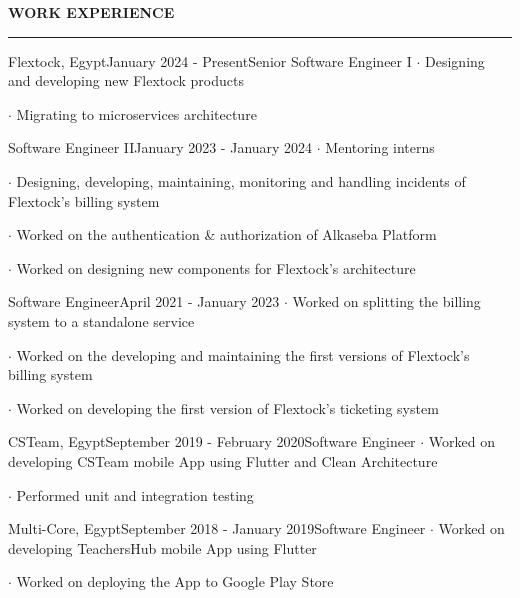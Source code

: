 \noindent\textcolor{themecolor}{\textbf{WORK EXPERIENCE}}

\vspace{2mm}
\hrule
\vspace{3mm}

\begin{verbose}{Flextock, Egypt}{January 2024 - Present}{Senior Software Engineer I}
    \noindent $\cdot$ Designing and developing new Flextock products

    \noindent $\cdot$ Migrating to microservices architecture
\end{verbose}

\begin{verboselevel2}{Software Engineer II}{January 2023 - January 2024}
    \noindent $\cdot$ Mentoring interns

    \noindent $\cdot$ Designing, developing, maintaining, monitoring and handling incidents of Flextock's billing system

    \noindent $\cdot$ Worked on the authentication \& authorization of Alkaseba Platform

    \noindent $\cdot$ Worked on designing new components for Flextock's architecture
\end{verboselevel2}

\begin{verboselevel2}{Software Engineer}{April 2021 - January 2023}
    \noindent $\cdot$ Worked on splitting the billing system to a standalone service

    \noindent $\cdot$ Worked on the developing and maintaining the first versions of Flextock's billing system

    \noindent $\cdot$ Worked on developing the first version of Flextock's ticketing system
\end{verboselevel2}

\vspace{3mm}

\begin{verbose}{CSTeam, Egypt}{September 2019 - February 2020}{Software Engineer}
    \noindent $\cdot$ Worked on developing CSTeam mobile App using Flutter and Clean Architecture

    \noindent $\cdot$ Performed unit and integration testing
\end{verbose}

\vspace{3mm}

\begin{verbose}{Multi-Core, Egypt}{September 2018 - January 2019}{Software Engineer}
    \noindent $\cdot$ Worked on developing TeachersHub mobile App using Flutter

    \noindent $\cdot$ Worked on deploying the App to Google Play Store
\end{verbose}

